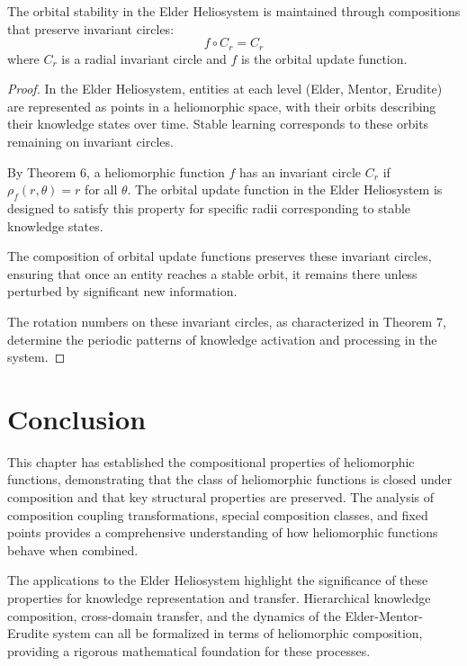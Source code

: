 \begin{theorem}
The orbital stability in the Elder Heliosystem is maintained through compositions that preserve invariant circles:
\begin{equation}
f \circ C_r = C_r
\end{equation}
where $C_r$ is a radial invariant circle and $f$ is the orbital update function.
\end{theorem}

\begin{proof}
In the Elder Heliosystem, entities at each level (Elder, Mentor, Erudite) are represented as points in a heliomorphic space, with their orbits describing their knowledge states over time. Stable learning corresponds to these orbits remaining on invariant circles.

By Theorem 6, a heliomorphic function $f$ has an invariant circle $C_r$ if $\rho_f(r,\theta) = r$ for all $\theta$. The orbital update function in the Elder Heliosystem is designed to satisfy this property for specific radii corresponding to stable knowledge states.

The composition of orbital update functions preserves these invariant circles, ensuring that once an entity reaches a stable orbit, it remains there unless perturbed by significant new information.

The rotation numbers on these invariant circles, as characterized in Theorem 7, determine the periodic patterns of knowledge activation and processing in the system.
\end{proof}

\section{Conclusion}

This chapter has established the compositional properties of heliomorphic functions, demonstrating that the class of heliomorphic functions is closed under composition and that key structural properties are preserved. The analysis of composition coupling transformations, special composition classes, and fixed points provides a comprehensive understanding of how heliomorphic functions behave when combined.

The applications to the Elder Heliosystem highlight the significance of these properties for knowledge representation and transfer. Hierarchical knowledge composition, cross-domain transfer, and the dynamics of the Elder-Mentor-Erudite system can all be formalized in terms of heliomorphic composition, providing a rigorous mathematical foundation for these processes.

